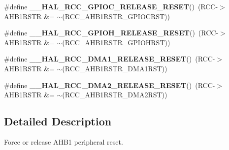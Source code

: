 \begin{DoxyCompactItemize}
\item 
\#define {\bfseries \+\_\+\+\_\+\+H\+A\+L\+\_\+\+R\+C\+C\+\_\+\+G\+P\+I\+O\+C\+\_\+\+R\+E\+L\+E\+A\+S\+E\+\_\+\+R\+E\+S\+ET}()~(R\+CC-\/$>$A\+H\+B1\+R\+S\+TR \&= $\sim$(R\+C\+C\+\_\+\+A\+H\+B1\+R\+S\+T\+R\+\_\+\+G\+P\+I\+O\+C\+R\+ST))\hypertarget{group___r_c_c___a_h_b1___force___release___reset_ga1df0e3536d3450435bdccdbe9c878736}{}\label{group___r_c_c___a_h_b1___force___release___reset_ga1df0e3536d3450435bdccdbe9c878736}

\item 
\#define {\bfseries \+\_\+\+\_\+\+H\+A\+L\+\_\+\+R\+C\+C\+\_\+\+G\+P\+I\+O\+H\+\_\+\+R\+E\+L\+E\+A\+S\+E\+\_\+\+R\+E\+S\+ET}()~(R\+CC-\/$>$A\+H\+B1\+R\+S\+TR \&= $\sim$(R\+C\+C\+\_\+\+A\+H\+B1\+R\+S\+T\+R\+\_\+\+G\+P\+I\+O\+H\+R\+ST))\hypertarget{group___r_c_c___a_h_b1___force___release___reset_gaaf11aa8bacb98c4e567bbaa58635acec}{}\label{group___r_c_c___a_h_b1___force___release___reset_gaaf11aa8bacb98c4e567bbaa58635acec}

\item 
\#define {\bfseries \+\_\+\+\_\+\+H\+A\+L\+\_\+\+R\+C\+C\+\_\+\+D\+M\+A1\+\_\+\+R\+E\+L\+E\+A\+S\+E\+\_\+\+R\+E\+S\+ET}()~(R\+CC-\/$>$A\+H\+B1\+R\+S\+TR \&= $\sim$(R\+C\+C\+\_\+\+A\+H\+B1\+R\+S\+T\+R\+\_\+\+D\+M\+A1\+R\+ST))\hypertarget{group___r_c_c___a_h_b1___force___release___reset_ga8f7eef8316c35175df11d77f5106d334}{}\label{group___r_c_c___a_h_b1___force___release___reset_ga8f7eef8316c35175df11d77f5106d334}

\item 
\#define {\bfseries \+\_\+\+\_\+\+H\+A\+L\+\_\+\+R\+C\+C\+\_\+\+D\+M\+A2\+\_\+\+R\+E\+L\+E\+A\+S\+E\+\_\+\+R\+E\+S\+ET}()~(R\+CC-\/$>$A\+H\+B1\+R\+S\+TR \&= $\sim$(R\+C\+C\+\_\+\+A\+H\+B1\+R\+S\+T\+R\+\_\+\+D\+M\+A2\+R\+ST))\hypertarget{group___r_c_c___a_h_b1___force___release___reset_gab7d22b3d82cd2616c8e3fa930e437757}{}\label{group___r_c_c___a_h_b1___force___release___reset_gab7d22b3d82cd2616c8e3fa930e437757}

\end{DoxyCompactItemize}


\subsection{Detailed Description}
Force or release A\+H\+B1 peripheral reset. 

